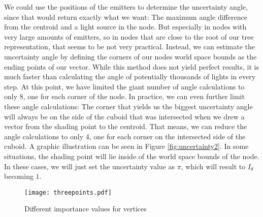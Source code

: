 We could use the positions of the emitters to determine the uncertainty angle, since that would return exactly what we want: The maximum angle difference from the centroid and a light source in the node. But especially in nodes with very large amounts of emitters, so in nodes that are close to the root of our tree representation, that seems to be not very practical. Instead, we can estimate the uncertainty angle by defining the corners of our nodes world space bounds as the ending points of our vector. While this method does not yield perfect results, it is much faster than calculating the angle of potentially thousands of lights in every step. At this point, we have limited the giant number of angle calculations to only 8, one for each corner of the node. In practice, we can even further limit these angle calculations: The corner that yields us the biggest uncertainty angle will always be on the side of the cuboid that was intersected when we drew a vector from the shading point to the centroid. That means, we can reduce the angle calculations to only 4, one for each corner on the intersected side of the cuboid. A graphic illustration can be seen in Figure \ref{fig:uncertainty2}. In some situations, the shading point will lie inside of the world space bounds of the node. In these cases, we will just set the uncertainty value as $\pi$, which will result to $I_\theta$ becoming $1$.

\begin{figure}
	\begin{center}
		\texttt{[image: threepoints.pdf]}
		\caption{Different importance values for vertices}
		\label{fig:threepoints}
	\end{center}
\end{figure}

